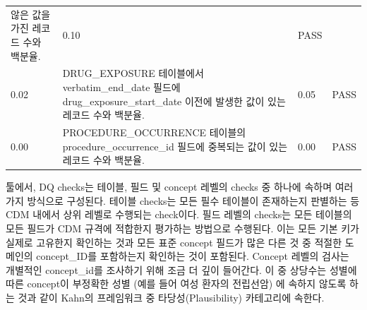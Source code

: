 \documentclass[11pt]{book}
\theoremstyle{definition}
\theoremstyle{definition}
\theoremstyle{definition}
\theoremstyle{remark}
\begin{document}
\begin{longtable}[]{@{}llll@{}}
\begin{minipage}[t]{0.47\columnwidth}
않은 값을 가진 레코드 수와 백분율.\strut
\end{minipage} & \begin{minipage}[t]{0.10\columnwidth}\raggedright\strut
0.10\strut
\end{minipage} & \begin{minipage}[t]{0.07\columnwidth}\raggedright\strut
PASS\strut
\end{minipage}\tabularnewline
\begin{minipage}[t]{0.12\columnwidth}\raggedright\strut
0.02\strut
\end{minipage} & \begin{minipage}[t]{0.47\columnwidth}\raggedright\strut
DRUG\_EXPOSURE 테이블에서 verbatim\_end\_date 필드에
drug\_exposure\_start\_date 이전에 발생한 값이 있는 레코드 수와
백분율.\strut
\end{minipage} & \begin{minipage}[t]{0.10\columnwidth}\raggedright\strut
0.05\strut
\end{minipage} & \begin{minipage}[t]{0.07\columnwidth}\raggedright\strut
PASS\strut
\end{minipage}\tabularnewline
\begin{minipage}[t]{0.12\columnwidth}\raggedright\strut
0.00\strut
\end{minipage} & \begin{minipage}[t]{0.47\columnwidth}\raggedright\strut
PROCEDURE\_OCCURRENCE 테이블의 procedure\_occurrence\_id 필드에 중복되는
값이 있는 레코드 수와 백분율.\strut
\end{minipage} & \begin{minipage}[t]{0.10\columnwidth}\raggedright\strut
0.00\strut
\end{minipage} & \begin{minipage}[t]{0.07\columnwidth}\raggedright\strut
PASS\strut
\end{minipage}\tabularnewline
\bottomrule
\end{longtable}

툴에서, DQ checks는 테이블, 필드 및 concept 레벨의 checks 중 하나에
속하며 여러 가지 방식으로 구성된다. 테이블 checks는 모든 필수 테이블이
존재하는지 판별하는 등 CDM 내에서 상위 레벨로 수행되는 check이다. 필드
레벨의 checks는 모든 테이블의 모든 필드가 CDM 규격에 적합한지 평가하는
방법으로 수행된다. 이는 모든 기본 키가 실제로 고유한지 확인하는 것과
모든 표준 concept 필드가 많은 다른 것 중 적절한 도메인의 concept\_ID를
포함하는지 확인하는 것이 포함된다. Concept 레벨의 검사는 개별적인
concept\_id를 조사하기 위해 조금 더 깊이 들어간다. 이 중 상당수는 성별에
따른 concept이 부정확한 성별 (예를 들어 여성 환자의 전립선암) 에 속하지
않도록 하는 것과 같이 Kahn의 프레임워크 중 타당성(Plausibility)
카테고리에 속한다.
\end{document}

